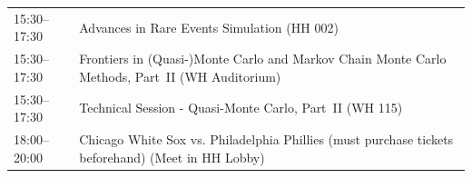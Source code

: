 \documentclass[12pt,lettersize,oneside]{book} %
\begin{document}
\begin{table}
{\begin{tabularx}{\textwidth}{>{\hsize=0.32\hsize}X|>{\hsize=1.7\hsize}X}
\cellcolor{\SessionTitleColor}15:30--17:30 & \cellcolor{\SessionTitleColor}Advances in Rare Events Simulation (HH 002) \\
\cellcolor{\SessionTitleColor}15:30--17:30 & \cellcolor{\SessionTitleColor}Frontiers in (Quasi-)Monte Carlo and Markov Chain Monte Carlo Methods, Part~II (WH Auditorium) \\
\cellcolor{\SessionLightColor}15:30--17:30 & \cellcolor{\SessionLightColor}Technical Session - Quasi-Monte Carlo, Part~II (WH 115) \\
\cellcolor{\SessionTitleColor}18:00--20:00 & \cellcolor{\SessionTitleColor}Chicago White Sox vs. Philadelphia Phillies (must purchase tickets beforehand) (Meet in HH Lobby) \\
\hline
\end{tabularx}
}
\end{table}
\end{document}
